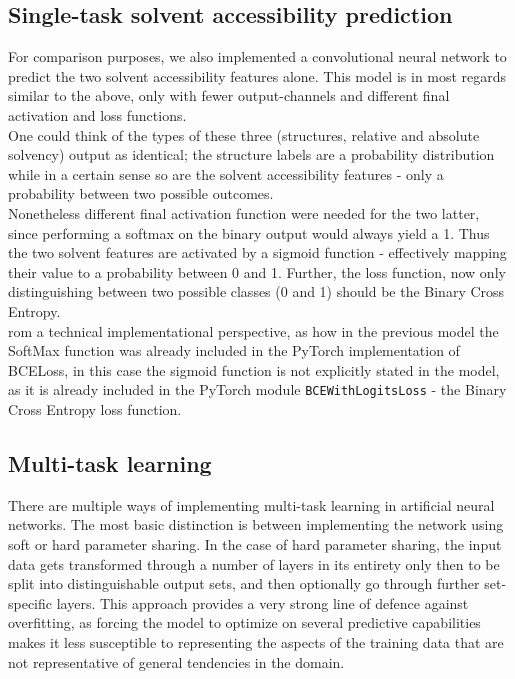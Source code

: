 \begin{multicols}{2}
\subsection{Single-task solvent accessibility prediction}
For comparison purposes, we also implemented a convolutional neural network to predict the two solvent accessibility features alone. This model is in most regards similar to the above, only with fewer output-channels and different final activation and loss functions.\\
One could think of the types of these three (structures, relative and absolute solvency) output as identical; the structure labels are a probability distribution while in a certain sense so are the solvent accessibility features - only a probability between two possible outcomes.\\
Nonetheless different final activation function were needed for the two latter, since performing a softmax on the binary output would always yield a 1. Thus the two solvent features are activated by a sigmoid function - effectively mapping their value to a probability between 0 and 1. Further, the loss function, now only distinguishing between two possible classes (0 and 1) should be the Binary Cross Entropy.\\
rom a technical implementational perspective, as how in the previous model the SoftMax function was already included in the PyTorch implementation of BCELoss, in this case the sigmoid function is not explicitly stated in the model, as it is already included in the PyTorch module \texttt{BCEWithLogitsLoss} - the Binary Cross Entropy loss function.

\subsection{Multi-task learning}
There are multiple ways of implementing multi-task learning in artificial neural networks. The most basic distinction is between implementing the network using soft or hard parameter sharing. In the case of hard parameter sharing, the input data gets transformed through a number of layers in its entirety only then to be split into distinguishable output sets, and then optionally go through further set-specific layers. This approach provides a very strong line of defence against overfitting, as forcing the model to optimize on several predictive capabilities makes it less  susceptible to representing the aspects of the training data that are not representative of general tendencies in the domain. 


\end{multicols}

